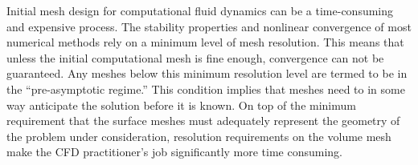 \documentclass[12pt]{report} %
\begin{document}
\begin{acknowledgments}



\end{acknowledgments}


%
\utabstract
{}%
\indent
Initial mesh design for computational fluid dynamics can be a time-consuming and expensive process. 
The stability properties and nonlinear convergence of most numerical methods rely on a minimum level of mesh resolution. 
This means that unless the initial computational mesh is fine enough, convergence can not be guaranteed. 
Any meshes below this minimum resolution level are termed to be in the ``pre-asymptotic regime.'' 
This condition implies that meshes need to in some way anticipate the solution before it is known. 
On top of the minimum requirement that the surface meshes must adequately represent the geometry of the problem under consideration, 
resolution requirements on the volume mesh make the CFD practitioner's job significantly more time consuming. 
\end{document}
